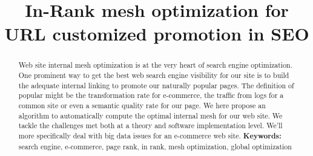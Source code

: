 \documentclass{iSWAGArticle}
\title{In-Rank mesh optimization for URL customized promotion in SEO}
\author{\iSWAGAuthor{Stefan Duprey\\
Cdiscount\\
stefan.duprey@cdiscount.com} \and \iSWAGAuthor{Second Author\\
Second University\\
second.author@university2.com}}
\begin{document}
\maketitle

\begin{abstract}
 Web site internal mesh optimization is at the very heart of search engine optimization. 
 One prominent way to get the best web search engine visibility for our site 
 is to build the adequate internal linking to promote our naturally popular pages. 
 The definition of popular might be the transformation rate for e-commerce, 
 the traffic from logs for a common site or even a semantic quality rate for our page. 
 We here propose an algorithm to automatically compute the optimal internal mesh for our web site.
 We tackle the challenges met both at a theory and software implementation level. 
 We'll more specifically deal with big data issues for an e-commerce web site.
 \newline
 \indent \textbf{Keywords: }
 \newline
search engine, e-commerce, page rank, in rank, mesh optimization, global optimization
\end{abstract}
\end{document}
